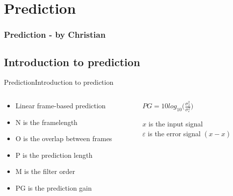 \section{Prediction}
\begin{frame}
	\frametitle{Prediction - by Christian}
	\tableofcontents[currentsection]
\end{frame}

\subsection{Introduction to prediction}
\begin{frame}{Prediction}{Introduction to prediction}
	\begin{columns}
		\begin{column}{0.5\textwidth}
			\begin{itemize}
				\item Linear frame-based prediction
				\item N is the framelength
				\item O is the overlap between frames
				\item P is the prediction length
				\item M is the filter order
				\item PG is the prediction gain
			\end{itemize}
		\end{column}
		\begin{column}{0.5\textwidth} 
			$PG = 10 log_{10}\bigg(\frac{\sigma^2_x}{\sigma^2_\varepsilon}\bigg)	$
			
			$x$ is the input signal\\
			$\varepsilon$ is the error signal $(x-\hat{x})$
		\end{column}
	\end{columns}
\end{frame}



